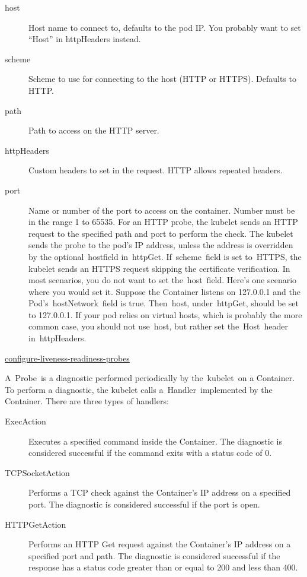 \begin{description}
	\item[host] Host name to connect to, defaults to the pod IP. You probably want to set “Host” in httpHeaders instead.
	\item[scheme] Scheme to use for connecting to the host (HTTP or HTTPS). Defaults to HTTP.
	\item[path] Path to access on the HTTP server.
	\item[httpHeaders] Custom headers to set in the request. HTTP allows repeated headers.
	\item[port] Name or number of the port to access on the container. Number must be in the range 1 to 65535.
For an HTTP probe, the kubelet sends an HTTP request to the specified path and port to perform the check. The kubelet sends the probe to the pod’s IP address, unless the address is overridden by the optional hostfield in httpGet. If scheme field is set to HTTPS, the kubelet sends an HTTPS request skipping the certificate verification. In most scenarios, you do not want to set the host field. Here’s one scenario where you would set it. Suppose the Container listens on 127.0.0.1 and the Pod’s hostNetwork field is true. Then host, under httpGet, should be set to 127.0.0.1. If your pod relies on virtual hosts, which is probably the more common case, you should not use host, but rather set the Host header in httpHeaders.
\end{description}

\href{https://kubernetes.io/docs/tasks/configure-pod-container/configure-liveness-readiness-probes/}{configure-liveness-readiness-probes}

A Probe is a diagnostic performed periodically by the kubelet on a Container. To perform a diagnostic, the kubelet calls a Handler implemented by the Container. There are three types of handlers:

\begin{description}
\item[ExecAction] Executes a specified command inside the Container. The diagnostic is considered successful if the command exits with a status code of 0.
\item[TCPSocketAction] Performs a TCP check against the Container’s IP address on a specified port. The diagnostic is considered successful if the port is open.
\item[HTTPGetAction] Performs an HTTP Get request against the Container’s IP address on a specified port and path. The diagnostic is considered successful if the response has a status code greater than or equal to 200 and less than 400.
\end{description}

